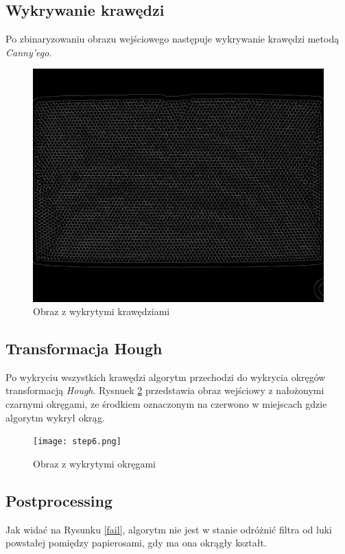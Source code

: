 \documentclass[12pt]{article}
\begin{document}
\subsection{Wykrywanie krawędzi}
Po zbinaryzowaniu obrazu wejściowego następuje wykrywanie krawędzi metodą \textit{Canny'ego}.

\begin{figure}[H]
\centering \includegraphics[scale=0.108]{step5.png}
\caption{Obraz z wykrytymi krawędziami}
\label{edges}
\end{figure}

\subsection{Transformacja Hough}
Po wykryciu wszystkich krawędzi algorytm przechodzi do wykrycia okręgów transformacją \textit{Hough}. Rysnuek \ref{circles} przedstawia obraz wejściowy z nałożonymi czarnymi okręgami, ze środkiem oznaczonym na czerwono w miejscach gdzie algorytm wykrył okrąg.

\begin{figure}[H]
\centering \texttt{[image: step6.png]}
\caption{Obraz z wykrytymi okręgami}
\label{circles}
\end{figure}

\subsection{Postprocessing}
Jak widać na Rysunku \ref{fail}, algorytm nie jest w stanie odróżnić filtra od luki powstałej pomiędzy papierosami, gdy ma ona okrągły kształt.
\end{document}
